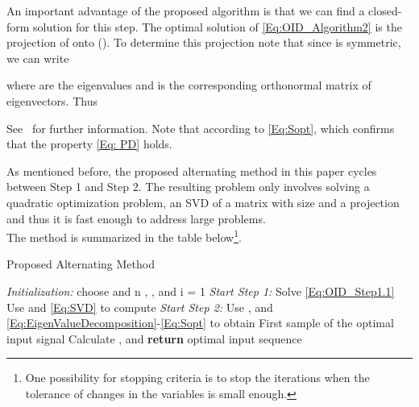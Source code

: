 \documentclass{ifacconf}
\begin{document}
An important advantage of the proposed algorithm is that we can find a closed-form solution for this step. The optimal solution of \eqref{Eq:OID_Algorithm2} is the projection of  onto   (\cite{ProjectionMethodsInConicOptimization2012}). To determine this projection note that since  is symmetric, we can write

where  are the eigenvalues and  is the corresponding orthonormal matrix of eigenvectors. Thus

See~\cite{ProjectionMethodsInConicOptimization2012} for further information.
Note that  according to \eqref{Eq:Sopt}, which confirms that the property \eqref{Eq: PD} holds.

As mentioned before, the proposed alternating method in this paper cycles between Step 1 and Step 2. The resulting problem only involves solving a quadratic optimization problem, an SVD of a matrix with size  and a projection and thus it is fast enough to address large problems. 
\\
The method is summarized in the table below\footnote{One possibility for stopping criteria is to stop the iterations when the tolerance of changes in the variables is small enough.}. 
\begin{algorithm}
\renewcommand{\thealgorithm}{}
  \caption{Proposed Alternating Method}\label{Proposed Alternating Method}
  \begin{algorithmic}[]
	  \State \emph{Initialization:}
	\State \quad choose  and n
	\State \quad , ,  and 	\While{}
			\State i = 1
				\State \emph{Start Step 1:}
				\State \quad Solve \eqref{Eq:OID_Step1.1}
				\State \quad 
				\State \quad Use  and \eqref{Eq:SVD} to compute 
				\State \quad 
				\State\emph{Start Step 2:}
				\State \quad Use ,  and \eqref{Eq:EigenValueDecomposition}-\eqref{Eq:Sopt} to obtain 
				\State \quad 
				\State 
			\EndWhile
        \State First sample of the optimal input signal
        \State Calculate ,  and 
        \State 
      \EndWhile\label{euclidendwhile}
      \State \textbf{return} optimal input sequence 
  \end{algorithmic}
\end{algorithm}
\vspace{-0.4cm}
\end{document}
